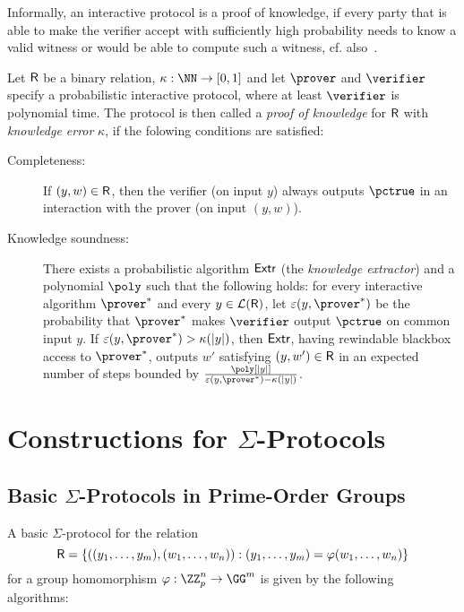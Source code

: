 \documentclass[runningheads]{llncs}
\begin{document}
Informally, an interactive protocol is a proof of knowledge, if every party that is able to make the verifier accept with sufficiently high probability needs to know a valid witness or would be able to compute such a witness, cf. also~\cite[1.6.3]{zkproof-reference}.
\begin{definition}\label{def:pok}
  Let $\mathsf{R}$ be a binary relation, $\kappa:\NN\to[0,1]$ and let $\prover$ and $\verifier$ specify a probabilistic interactive protocol, where at least $\verifier$ is polynomial time.
  The protocol is then called a \emph{proof of knowledge} for $\mathsf{R}$ with \emph{knowledge error} $\kappa$, if the folowing conditions are satisfied:
  \begin{description}
    \item[Completeness:]
      If $(y,w)\in\mathsf{R}$, then the verifier (on input $y$) always outputs $\accept$ in an interaction with the prover (on input $(y,w)$).
    \item[Knowledge soundness:]
      There exists a probabilistic algorithm $\mathsf{Extr}$ (the \emph{knowledge extractor}) and a polynomial $\poly$ such that the following holds:
      for every interactive algorithm $\prover^*$ and every $y\in\mathcal{L}(\mathsf{R})$, let $\varepsilon(y,\prover^*)$ be the probability that $\prover^*$ makes $\verifier$ output $\accept$ on common input $y$.
      If $\varepsilon(y,\prover^*)>\kappa(|y|)$, then $\mathsf{Extr}$, having rewindable blackbox access to $\prover^*$, outputs $w'$ satisfying $(y,w')\in\mathsf{R}$ in an expected number of steps bounded by $\frac{\poly[|y|]}{\varepsilon(y,\prover^*)-\kappa(|y|)}$.
  \end{description}
\end{definition}

\section{Constructions for $\Sigma$-Protocols}
\subsection{Basic $\Sigma$-Protocols in Prime-Order Groups}\label{sec:basicsigma}
A basic $\Sigma$-protocol for the relation
$$\mathsf{R}=\{((y_1,\dots,y_m),(w_1,\dots,w_n)) : (y_1,\dots,y_m)=\varphi(w_1,\dots,w_n)\}$$
 for a group homomorphism $\varphi:\ZZ_p^n\to\GG^m$ is given by the following algorithms:
\end{document}
